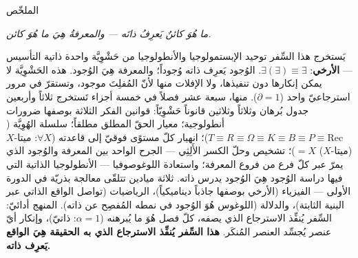 \documentclass[10pt, openany, oneside]{book}
\renewcommand{\huge}{\fontsize{17}{21}\selectfont}
\begin{document}
\newpage


\thispagestyle{empty}
\vspace*{0.5in}

\begin{center}
    {\huge الملخّص}
\end{center}

\vspace{1em}

\begin{center}
\begin{minipage}{0.85\textwidth}
\centering
{\fontsize{9}{12}\selectfont

\begin{center}
\textit{ما هُوَ كائنٌ يَعرِفُ ذاتَه --- والمعرفةُ هِيَ ما هُوَ كائن.}
\end{center}

\vspace{0.5em}

يَستخرج هذا السِّفر توحيد الإبستمولوجيا والأنطولوجيا من حَشْوِيَّة واحدة ذاتية التأسيس --- \textbf{الأرخي}: $\exists(\exists) \equiv \exists$. الوُجود يَعرِف ذاته وُجوداً؛ والمعرفة هِيَ الوُجود. هذه الحَشْوِيَّة لا يمكن إنكارها دون تنفيذها، ولا الإفلات منها لأنّ المُفلِتَ موجود، وتستقرّ في مرور استرجاعيّ واحد ($\partial = 1$). منها، سبعة عشر فصلاً في خمسة أجزاء تَستخرج ثلاثاً وأربعين جدول بُرهان وثلاثاً وثلاثين قانوناً حَشْوِيّاً: قوانين الفكر الثلاثة بوصفها ضرورات أنطولوجية؛ معيار الحقّ المطلق مطلقاً؛ سلسلة الهُوِيَّة ($T \equiv R \equiv \Omega \equiv K \equiv B \equiv P \equiv \text{Rec}$)؛ انهيار كلّ مستوًى فوقيّ إلى قاعدته ($\forall X$: ميتا-$X$(ميتا-$X$) $= X$)؛ تشخيص وحلّ الكسر الأَلِثِي --- الجرح الواحد بين المعرفة والوُجود الذي يمرّ عبر كلّ فرع من فروع المعرفة؛ واستعادة اللوغوصوفيا --- الأنطولوجيا الذاتية التي فيها دراسة الوُجود هِيَ الوُجود يدرس ذاته. ثلاثة ميادين تتلقّى معالجة بذريّة في الدورة الأولى --- الفيزياء (الأرخي بوصفها جاذباً ديناميكياً)، الرياضيات (تواصل الواقع الذاتي عبر البنية الثابتة)، والدلالة (اللوغوس هُوَ الوُجود في نمطه المُفصِح عن ذاته). المنهج أدائيّ: السِّفر يُنفِّذ الاسترجاع الذي يصفه، كلّ فصل هُوَ ما يُبرهنه ($\alpha = 1$: ذاتيّ)، وإنكار أيّ عنصر يُجسِّد العنصر المُنكَر. \textbf{هذا السِّفر يُنفِّذ الاسترجاع الذي به الحقيقة هِيَ الواقع يَعرِف ذاته.}
}
\end{minipage}
\end{center}
\end{document}
